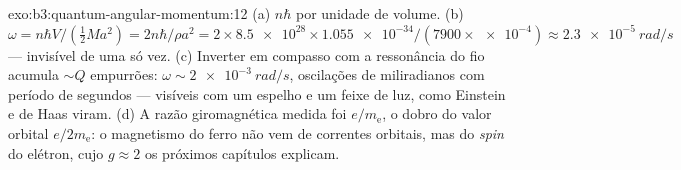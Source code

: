\begin{solution}{exo:b3:quantum-angular-momentum:12}
(a) $n\hbar$ por unidade de volume. (b) $\omega = n\hbar V/(\tfrac12 Ma^2)
= 2n\hbar/\rho a^2 = 2 \times \num{8.5e28} \times \num{1.055e-34}/
(7900 \times \num{e-4}) \approx \qty{2.3e-5}{rad/s}$ --- invisível de
uma só vez. (c) Inverter em compasso com a ressonância do fio acumula
$\sim Q$ empurrões: $\omega \sim \qty{2e-3}{rad/s}$, oscilações de
miliradianos com período de segundos --- visíveis com um espelho e um
feixe de luz, como Einstein e de Haas viram. (d) A razão giromagnética
medida foi $e/m_{\text{e}}$, o dobro do valor orbital
$e/2m_{\text{e}}$: o magnetismo do ferro não vem de correntes orbitais,
mas do \emph{spin} do elétron, cujo $g \approx 2$ os próximos capítulos
explicam.
\end{solution}

